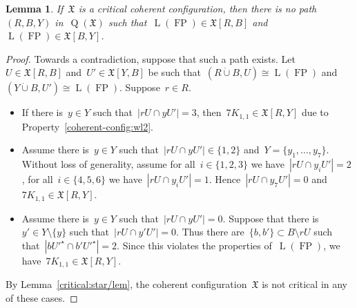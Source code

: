 \documentclass[english,a4paper]{article}
\theoremstyle{plain}
\newtheorem{lemma}      [theorem]{Lemma}
\theoremstyle{definition}
\newcommand{\abs}[1]{| #1 |}
\newcommand{\disjointUnion}{\ensuremath{\mathbin{\dot{\cup}}}}
\newcommand{\coherentConfig}{\ensuremath{\mathfrak{X}}}
\newcommand{\interspace}[2]{\ensuremath{\coherentConfig[#1,#2]}}
\DeclareMathOperator*{\Quotient}{Q}
\newcommand{\quotientGraph}[1]{\ensuremath{\Quotient(#1)}}
\DeclareMathOperator{\fanoPlane}{FP}
\DeclareMathOperator{\LeviGraph}{L}
\newcommand{\leviGraph}[1]{\ensuremath{\LeviGraph\!\left(#1\right)}}
\newcommand{\leviFano}{\leviGraph{\fanoPlane}}
\newcommand{\matching}[1]{\ensuremath{#1 K_{1,1}}}
\begin{document}
\begin{lemma}
\label{critical:7-cc:leviFano/lem}
    If~$\coherentConfig$ is a critical coherent configuration, then there is no path~$(R,B,Y)$ in~$\quotientGraph{\coherentConfig}$ such that~$\leviFano \in \interspace{R}{B}$ and~$\leviFano \in \interspace{B}{Y}$.
\end{lemma}
\begin{proof}
    Towards a contradiction, suppose that such a path exists.
    Let~$U \in \interspace{R}{B}$ and~$U' \in \interspace{Y}{B}$ be such that~$(R \disjointUnion B, U) \cong \leviFano$ and~$(Y \disjointUnion B, U') \cong \leviFano$.
    Suppose~$r \in R$.
    \begin{itemize}
        \item
        If there is~$y \in Y$ such that~$\abs{r U \cap y U'} = 3$, then~$\matching{7} \in \interspace{R}{Y}$ due to Property~\ref{coherent-config:wl2}.

        \item
        Assume there is~$y \in Y$ such that~$\abs{r U \cap y U'} \in \{1,2\}$ and~$Y = \{y_1, \dots, y_7\}$.
        Without loss of generality, assume for all~$i \in \{1,2,3\}$ we have~$\abs{r U \cap y_i U'} = 2$, for all~$i \in \{4,5,6\}$ we have~$\abs{r U \cap y_i U'} = 1$.
        Hence~$\abs{r U \cap y_7 U'} = 0$ and~$\matching{7} \in \interspace{R}{Y}$.

        \item
        Assume there is~$y \in Y$ such that~$\abs{r U \cap y U'} = 0$.
        Suppose that there is~$y' \in  Y \setminus \{y\}$ such that~$\abs{r U \cap y' U'} = 0$.
        Thus there are~$\{b,b'\} \subset B \setminus r U$ such that~$\abs{b U'^\star \cap b' U'^\star} = 2$.
        Since this violates the properties of~$\leviFano$, we have~$\matching{7} \in \interspace{R}{Y}$.
    \end{itemize}
    By Lemma~\ref{critical:star/lem}, the coherent configuration~$\coherentConfig$ is not critical in any of these cases.
\end{proof}
\end{document}
